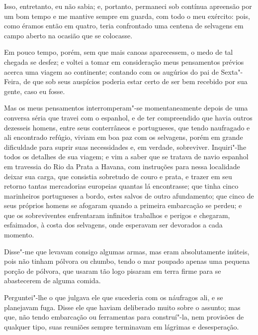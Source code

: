 Isso, entretanto, eu não sabia; e, portanto, permaneci sob contínua
apreensão por um bom tempo e me mantive sempre em guarda, com todo o meu
exército: pois, como éramos então em quatro, teria confrontado uma
centena de selvagens em campo aberto na ocasião que se colocasse.

Em pouco tempo, porém, sem que mais canoas aparecessem, o medo de tal
chegada se desfez; e voltei a tomar em consideração meus pensamentos
prévios acerca uma viagem ao continente; contando com os augúrios do pai
de Sexta"-Feira, de que sob seus auspícios poderia estar certo de ser bem
recebido por sua gente, caso eu fosse.

Mas os meus pensamentos interromperam"-se momentaneamente depois de uma
conversa séria que travei com o espanhol, e de ter compreendido que
havia outros dezesseis homens, entre seus conterrâneos e portugueses,
que tendo naufragado e ali encontrado refúgio, viviam em boa paz com os
selvagens, porém em grande dificuldade para suprir suas necessidades e,
em verdade, sobreviver. Inquiri"-lhe todos os detalhes de sua viagem; e
vim a saber que se tratava de navio espanhol em travessia do Rio da
Prata a Havana, com instruções para nessa localidade deixar sua carga,
que consistia sobretudo de couro e prata, e trazer em seu retorno tantas
mercadorias europeias quantas lá encontrasse; que tinha cinco
marinheiros portugueses a bordo, estes salvos de outro afundamento; que
cinco de seus próprios homens se afogaram quando a primeira embarcação
se perdeu; e que os sobreviventes enfrentaram infinitos trabalhos e
perigos e chegaram, esfaimados, à costa dos selvagens, onde esperavam
ser devorados a cada momento.

Disse"-me que levavam consigo algumas armas, mas eram absolutamente
inúteis, pois não tinham pólvora ou chumbo, tendo o mar poupado apenas
uma pequena porção de pólvora, que usaram tão logo pisaram em terra
firme para se abastecerem de alguma comida.

Perguntei"-lhe o que julgava ele que sucederia com os náufragos ali, e se
planejavam fuga. Disse ele que haviam deliberado muito sobre o assunto;
mas que, não tendo embarcação ou ferramentas para construí"-la, nem
provisões de qualquer tipo, suas reuniões sempre terminavam em lágrimas
e desesperação.


